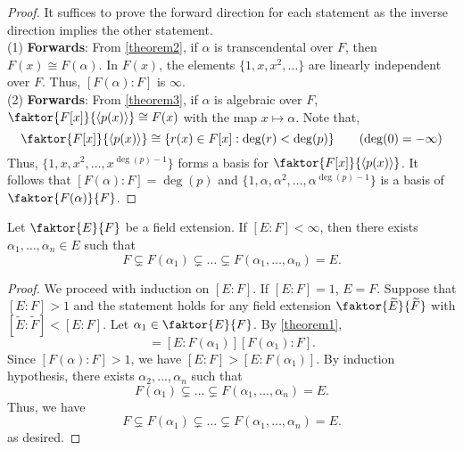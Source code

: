 \documentclass[11pt]{article}
\newcommand{\cyclic}[1]{\left\langle #1 \right\rangle}
\newcommand{\quotient}[2]{\faktor{#1}{#2}}
\begin{document}
\begin{proof}
It suffices to prove the forward direction for each statement as the inverse
direction implies the other statement.\\
(1) {\bf Forwards}: From \cref{theorem2}, if $\alpha$ is transcendental over $F$, then
$F(x) \cong F(\alpha)$. In $F(x)$, the elements $\{1, x, x^2, \dots\}$ are
linearly independent over $F$. Thus, $[F(\alpha):F]$ is $\infty$.\\
(2) {\bf Forwards}: From \cref{theorem3}, if $\alpha$ is algebraic over $F$,
$\quotient{F[x]}{\cyclic{p(x)}} \cong F(x)$ with the map $x \mapsto \alpha$. Note
that,
\begin{equation*}
\quotient{F[x]}{\cyclic{p(x)}} \cong \{r(x) \in F[x]: \deg(r) < \deg(p)\}
\tag{$\deg(0) = -\infty$}
\end{equation*}
Thus, $\{1, x, x^2, \dots, x^{\deg(p) - 1}\}$ forms a basis for
$\quotient{F[x]}{\cyclic{p(x)}}$. It follows that $[F(\alpha): F] =
\deg(p)$ and $\{1, \alpha, \alpha^2, \dots,
\alpha^{\deg (p) - 1}\}$ is a basis of $\quotient{F(\alpha)}{F}$.
\end{proof}
\begin{theorem}
Let $\quotient{E}{F}$ be a field extension. If $[E:F] < \infty$, then there exists $\alpha_1, \dots, \alpha_n \in E$ such that
\begin{equation*}
F \subsetneq F(\alpha_1) \subsetneq \dots \subsetneq F(\alpha_1, \dots, \alpha_n) = E.
\end{equation*}
\end{theorem}
\begin{proof}
We proceed with induction on $[E:F]$. If $[E:F] = 1$, $E=F$. Suppose that $[E:F]
> 1$ and the statement holds for any field extension $\quotient{\tilde
E}{\tilde F}$ with $[\tilde E : \tilde F] < [E:F]$. Let $\alpha_1 \in \quotient{E}{F}$.
By \cref{theorem1},
\begin{equation*}
[E:F] = [E:F(\alpha_1)][F(\alpha_1) : F].
\end{equation*}
Since $[F(\alpha):F] > 1$, we have $[E:F] > [E:F(\alpha_1)]$. By induction
hypothesis, there exists $\alpha_2, \dots, \alpha_n$ such that
\begin{equation*}
F(\alpha_1) \subsetneq \dots \subsetneq F(\alpha_1, \dots, \alpha_n) = E.
\end{equation*}
Thus, we have
\begin{equation*}
F \subsetneq F(\alpha_1) \subsetneq \dots \subsetneq F(\alpha_1, \dots, \alpha_n) = E.
\end{equation*}
as desired.
\end{proof}
\end{document}

